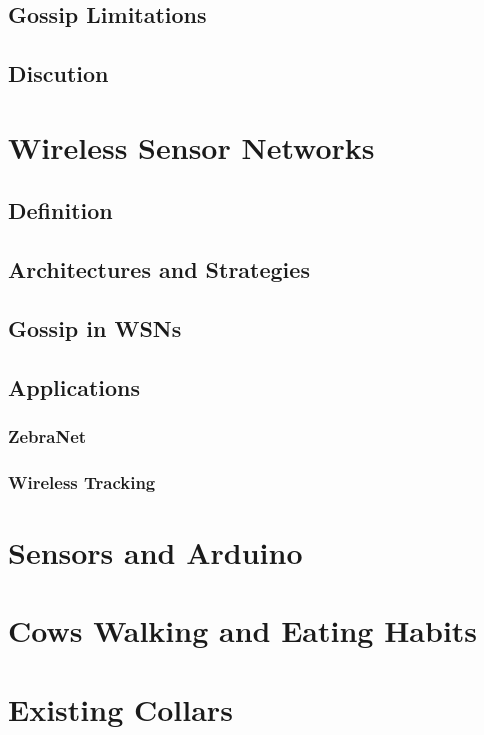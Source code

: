 \subsection{Gossip Limitations}

\subsection{Discution}

\section{Wireless Sensor Networks}
\label{sec:wireless_sensor_networks}

\subsection{Definition}

\subsection{Architectures and Strategies}

\subsection{Gossip in WSNs}

\subsection{Applications}
\subsubsection{ZebraNet}
\subsubsection{Wireless Tracking}

\section{Sensors and Arduino}
\label{sec:sensors_and_arduino}

\section{Cows Walking and Eating Habits}
\label{sec:cows}

\section{Existing Collars}
\label{sec:existing_collars}

